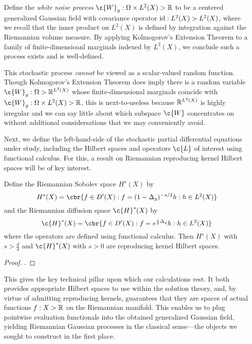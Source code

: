 \documentclass[11pt]{book}
\begin{document}
\begin{definition}
Define the \emph{white noise process} $\c{W}_g : \Omega \x L^2(X) \-> \R$ to be a centered generalized Gaussian field with covariance operator $\operatorname{id} : L^2(X) \-> L^2(X)$, where we recall that the inner product on $L^2(X)$ is defined by integration against the Riemannian volume measure.
By applying Kolmogorov's Extension Theorem to a family of finite-dimensioanl marginals indexed by $L^2(X)$, we conclude such a process exists and is well-defined.
\end{definition}

This stochastic process \emph{cannot} be viewed as a scalar-valued random function.
Though Kolmogorov's Extension Theorem does imply there is a random variable $\c{W}_g : \Omega \-> \R^{L^2(X)}$ whose finite-dimensional marginals coincide with $\c{W}_g : \Omega \x L^2(X) \-> \R$, this is next-to-useless because $\mathbb{R}^{L^2(X)}$ is highly irregular and we can say little about which subspace $\c{W}$ concentrates on without additional considersations that we may conveniently avoid.

Next, we define the left-hand-side of the stochastic partial differential equations under study, including the Hilbert spaces and operators $\c{L}$ of interest using functional calculus.
For this, a result on Riemannian reproducing kernel Hilbert spaces will be of key interest.

\begin{result}
\label{res:riemannian-sobolev}
Define the Riemannian Sobolev space $H^s(X)$ by
\[
H^s(X) = \cbr{f \in D'(X) : f = (1 - \lap_g)^{-s/2} h : h \in L^2(X)}
\]
and the Riemannian diffusion space $\c{H}^s(X)$ by
\[
\c{H}^s(X) = \cbr{f \in D'(X) : f = e^{\frac{s}{2}\lap_g} h : h \in L^2(X)}
\]
where the operators are defined using functional calculus.
Then $H^s(X)$ with $s > \frac{d}{4}$ and $\c{H}^s(X)$ with $s > 0$ are reproducing kernel Hilbert spaces.
\end{result}

\begin{proof}
\textcite[Theorem 3 and Theorem 6]{devito20}.
\end{proof}

This gives the key technical pillar upon which our calculations rest.
It both provides appropriate Hilbert spaces to use within the solution theory, and, by virtue of admitting reproducing kernels, guarantees that they are spaces of actual functions $f : X \-> \mathbb{R}$ on the Riemannian manifold.
This enables us to plug pointwise evaluation functionals into the obtained generalized Gaussian field, yielding Riemannian Gaussian processes in the classical sense---the objects we sought to construct in the first place.
\end{document}
